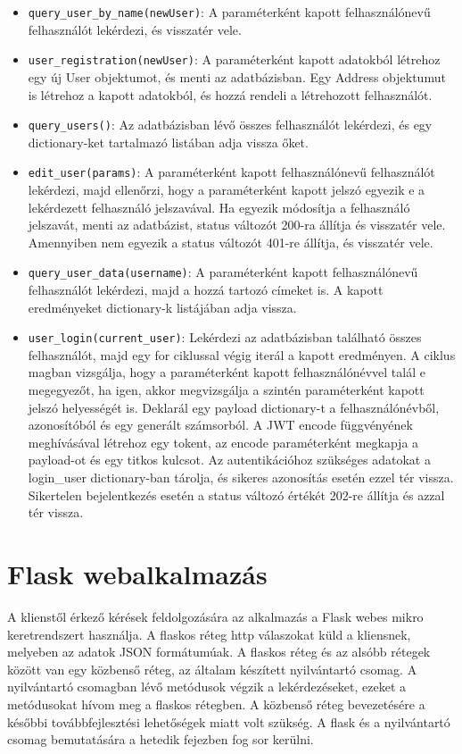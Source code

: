 \begin{itemize}
    \item \texttt{query\_user\_by\_name(newUser)}:
A paraméterként kapott felhasználónevű felhasználót lekérdezi, és visszatér vele.
\item \texttt{user\_registration(newUser)}:
A paraméterként kapott adatokból létrehoz egy új User objektumot, és menti az adatbázisban. Egy Address objektumut is létrehoz a kapott adatokból, és hozzá rendeli a létrehozott felhasználót. 
\item \texttt{query\_users()}:
Az adatbázisban lévő összes felhasználót lekérdezi, és egy dictionary-ket tartalmazó listában adja vissza őket.
\item \texttt{edit\_user(params)}:
A paraméterként kapott felhasználónevű felhasználót lekérdezi, majd ellenőrzi, hogy a paraméterként kapott jelszó egyezik e a lekérdezett felhasználó jelszavával. Ha egyezik módosítja a felhasználó jelszavát, menti az adatbázist, status változót 200-ra állítja és visszatér vele. Amennyiben nem egyezik a status változót 401-re állítja, és visszatér vele.
\item \texttt{query\_user\_data(username)}:
A paraméterként kapott felhasználónevű felhasználót lekérdezi, majd a hozzá tartozó címeket is. A kapott eredményeket dictionary-k listájában adja vissza.
\item \texttt{user\_login(current\_user)}:
Lekérdezi az adatbázisban található összes felhasználót, majd egy for ciklussal végig iterál a kapott eredményen. A ciklus magban vizsgálja, hogy a paraméterként kapott felhasználónévvel talál e megegyezőt, ha igen, akkor megvizsgálja a szintén paraméterként kapott jelszó helyességét is. Deklarál egy payload dictionary-t a felhasználónévből, azonosítóból és egy generált számsorból. A JWT encode függvényének meghívásával létrehoz egy tokent, az encode paraméterként megkapja a payload-ot és egy titkos kulcsot. Az autentikációhoz szükséges adatokat a login\_user dictionary-ban tárolja, és sikeres azonosítás esetén ezzel tér vissza. Sikertelen bejelentkezés esetén a status változó értékét 202-re állítja és azzal tér vissza.
\end{itemize}

\section{Flask webalkalmazás}

A klienstől érkező kérések feldolgozására az alkalmazás a Flask webes mikro keretrendszert használja. A flaskos réteg http válaszokat küld a kliensnek, melyeben az adatok JSON formátumúak. A flaskos réteg és az alsóbb rétegek között van egy közbenső réteg, az általam készített nyilvántartó csomag. A nyilvántartó csomagban lévő metódusok végzik a lekérdezéseket, ezeket a metódusokat hívom meg a flaskos rétegben. A közbenső réteg bevezetésére a későbbi továbbfejlesztési lehetőségek miatt volt szükség. A flask és a nyilvántartó csomag bemutatására a hetedik fejezben fog sor kerülni.

